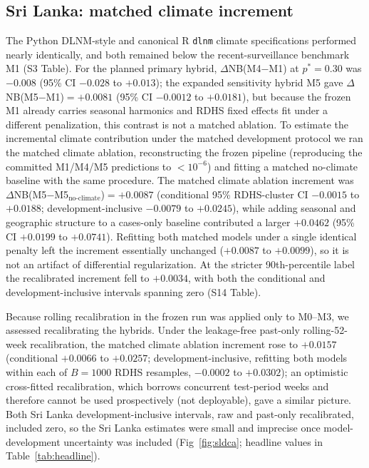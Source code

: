 \documentclass[11pt,a4paper]{article}
\begin{document}
\subsection{Sri Lanka: matched climate increment}
The Python DLNM-style and canonical R \texttt{dlnm} climate specifications performed nearly identically, and both remained below the recent-surveillance benchmark M1 (S3 Table). For the planned primary hybrid, $\Delta$NB(M4$-$M1) at $p^*=0.30$ was $-0.008$ (95\% CI $-0.028$ to $+0.013$); the expanded sensitivity hybrid M5 gave $\Delta$NB(M5$-$M1)$=+0.0081$ (95\% CI $-0.0012$ to $+0.0181$), but because the frozen M1 already carries seasonal harmonics and RDHS fixed effects fit under a different penalization, this contrast is not a matched ablation. To estimate the incremental climate contribution under the matched development protocol we ran the matched climate ablation, reconstructing the frozen pipeline (reproducing the committed M1/M4/M5 predictions to $<10^{-6}$) and fitting a matched no-climate baseline with the same procedure. The matched climate ablation increment was $\Delta$NB(M5$-$M5$_{\text{no-climate}}$)$=+0.0087$ (conditional 95\% RDHS-cluster CI $-0.0015$ to $+0.0188$; development-inclusive $-0.0079$ to $+0.0245$), while adding seasonal and geographic structure to a cases-only baseline contributed a larger $+0.0462$ (95\% CI $+0.0199$ to $+0.0741$). Refitting both matched models under a single identical penalty left the increment essentially unchanged ($+0.0087$ to $+0.0099$), so it is not an artifact of differential regularization. At the stricter 90th-percentile label the recalibrated increment fell to $+0.0034$, with both the conditional and development-inclusive intervals spanning zero (S14 Table).

Because rolling recalibration in the frozen run was applied only to M0--M3, we assessed recalibrating the hybrids. Under the leakage-free past-only rolling-52-week recalibration, the matched climate ablation increment rose to $+0.0157$ (conditional $+0.0066$ to $+0.0257$; development-inclusive, refitting both models within each of $B=1000$ RDHS resamples, $-0.0002$ to $+0.0302$); an optimistic cross-fitted recalibration, which borrows concurrent test-period weeks and therefore cannot be used prospectively (not deployable), gave a similar picture. Both Sri Lanka development-inclusive intervals, raw and past-only recalibrated, included zero, so the Sri Lanka estimates were small and imprecise once model-development uncertainty was included (Fig~\ref{fig:sldca}; headline values in Table~\ref{tab:headline}).
\end{document}
